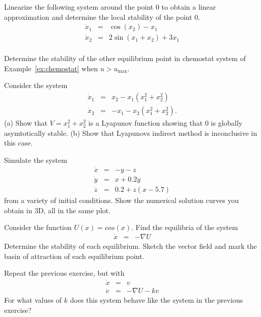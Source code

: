 \begin{exercise}
  Linearize the following system around the point $0$ to obtain a
  linear approximation and determine the local stability of the point
  $0$.
%
\begin{eqnarray*}
\dot x_1 & = & \cos ( x_2 ) - x_1 \\
\dot x_2 & = & 2 \sin ( x_1 + x_2 ) + 3 x_1 \\
\end{eqnarray*}
\end{exercise}

\begin{exercise}
  Determine the stability of the other equilibrium point in chemostat
  system of Example~\ref{ex:chemostat} when $u > u_\mathrm{max}$. 
\end{exercise}

\begin{exercise}
  Consider the system
%
\begin{eqnarray*}
\dot x_1 & = & x_2 - x_1 ( x_1^2 + x_2^2 ) \\
\dot x_2 & = & -x_1 - x_2 ( x_1^2 + x_2^2 ) .
\end{eqnarray*}
%
(a) Show that $V = x_1^2 + x_2^2$ is a Lyapunov function showing that
$0$ is globally asymtotically stable. (b) Show that Lyapunovs indirect
method is inconclusive in this case. 
%
\end{exercise}

\begin{exercise}
Simulate the system
%
\begin{eqnarray*}
\dot x & = & - y - z \\
\dot y & = & x + 0.2 y \\
\dot z & = & 0.2 + z ( x - 5.7 )
\end{eqnarray*}
from a variety of initial conditions. Show the numerical solution
curves you obtain in 3D, all in the same plot.
%
\end{exercise}

\begin{exercise}
%
Consider the function $U(x) = cos(x)$. Find the equilibria of the system
\begin{eqnarray*}
\dot x & = & -\nabla U
\end{eqnarray*}
Determine the stability of each equilibrium. Sketch the vector field and mark the basin of attraction of each equilibrium point. 
%
\end{exercise}

\begin{exercise}
%
Repeat the previous exercise, but with
\begin{eqnarray*}
\dot x & = & v \\
\dot v & = & -\nabla U - k v
\end{eqnarray*}
For what values of $k$ does this system behave like the system in the
previous exercise?
%
\end{exercise}

